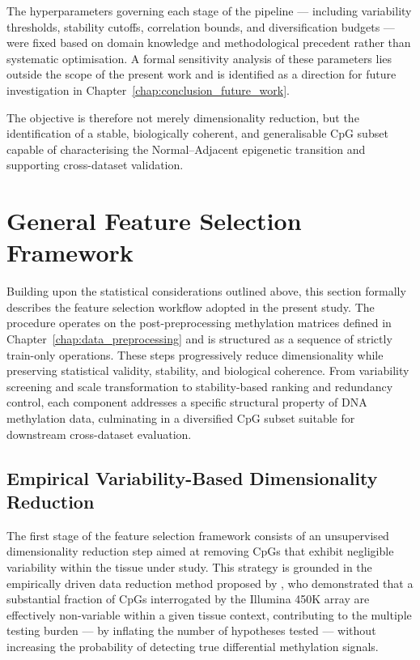 The hyperparameters governing each stage of the pipeline 
— including variability thresholds, stability cutoffs, 
correlation bounds, and diversification budgets — were 
fixed based on domain knowledge and methodological 
precedent rather than systematic optimisation. 
A formal sensitivity analysis of these parameters 
lies outside the scope of the present work and 
is identified as a direction for future investigation 
in Chapter~\ref{chap:conclusion_future_work}.

The objective is therefore not merely dimensionality reduction, but the 
identification of a stable, biologically coherent, and generalisable CpG 
subset capable of characterising the Normal–Adjacent epigenetic transition 
and supporting cross-dataset validation.

\section{General Feature Selection Framework}
\label{sec:fs_framework}

Building upon the statistical considerations outlined above, this section 
formally describes the feature selection workflow adopted in the present 
study. The procedure operates on the post-preprocessing methylation 
matrices defined in Chapter~\ref{chap:data_preprocessing} and is structured 
as a sequence of strictly train-only operations. These steps progressively 
reduce dimensionality while preserving statistical validity, stability, 
and biological coherence. From variability screening and scale 
transformation to stability-based ranking and redundancy control, 
each component addresses a specific structural property of DNA 
methylation data, culminating in a diversified CpG subset suitable 
for downstream cross-dataset evaluation.
\subsection{Empirical Variability-Based Dimensionality Reduction}
\label{subsubsec:fs_initial_filter}

The first stage of the feature selection framework consists of an 
unsupervised dimensionality reduction step aimed at removing CpGs 
that exhibit negligible variability within the tissue under study. 
This strategy is grounded in the empirically driven data reduction 
method proposed by \cite{Edgar2017}, who demonstrated that a 
substantial fraction of CpGs interrogated by the Illumina 450K array 
are effectively non-variable within a given tissue context, 
contributing to the multiple testing burden — by inflating the number of
hypotheses tested — without increasing the probability of detecting
true differential methylation signals.

